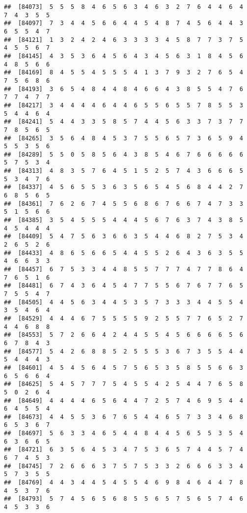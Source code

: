 \documentclass[
]{book}
\begin{document}
\begin{verbatim}
##  [84073]  5  5  5  8  4  6  5  6  3  4  6  3  2  7  6  4  4  6  4  7  4  3  5  5
##  [84097]  7  3  4  4  5  6  6  4  4  5  4  8  7  4  5  6  4  4  3  6  5  5  4  7
##  [84121]  1  3  2  4  2  4  6  3  3  3  3  4  5  8  7  7  3  7  5  4  5  5  6  7
##  [84145]  4  3  5  3  6  4  5  6  4  3  4  5  6  3  1  8  4  5  6  4  8  5  6  6
##  [84169]  8  4  5  5  4  5  5  5  4  1  3  7  9  3  2  7  6  5  4  7  5  6  8  6
##  [84193]  3  6  5  4  8  4  4  8  4  6  6  4  3  8  5  5  4  7  6  7  7  4  7  7
##  [84217]  3  4  4  4  4  6  4  4  6  5  5  6  5  5  7  8  5  5  3  5  4  4  6  4
##  [84241]  5  4  4  3  3  5  8  5  7  4  4  5  6  3  3  7  3  7  7  7  8  5  6  5
##  [84265]  3  5  6  4  8  4  5  3  7  5  5  6  5  7  3  6  5  9  4  5  5  3  5  6
##  [84289]  5  5  0  5  8  5  6  4  3  8  5  4  6  7  6  6  6  6  6  5  7  5  3  4
##  [84313]  4  8  3  5  7  6  4  5  1  5  2  5  7  4  3  6  6  6  5  5  3  4  7  6
##  [84337]  4  5  6  5  5  3  6  3  5  6  5  4  5  6  8  4  4  2  7  6  8  5  6  5
##  [84361]  7  6  2  6  7  4  5  5  6  8  6  7  6  6  7  4  7  3  3  5  1  5  6  6
##  [84385]  3  5  4  5  5  5  4  4  4  5  6  7  6  3  7  4  3  8  5  4  5  4  4  4
##  [84409]  5  4  7  5  6  3  6  6  3  5  4  4  6  8  2  7  5  3  4  2  6  5  2  6
##  [84433]  4  8  6  5  6  6  5  4  4  5  5  2  6  4  3  6  3  5  5  4  6  6  3  3
##  [84457]  6  7  5  3  3  4  4  8  5  5  7  7  7  4  7  7  8  6  4  7  6  5  1  6
##  [84481]  6  7  4  3  6  4  5  4  7  7  5  5  6  7  6  7  7  6  5  7  5  5  4  7
##  [84505]  4  4  5  6  3  4  4  5  3  5  7  3  3  3  4  4  5  5  4  3  5  4  6  4
##  [84529]  4  4  4  6  7  5  5  5  5  9  2  5  5  7  7  6  5  2  7  4  4  6  8  8
##  [84553]  5  7  2  6  6  4  2  4  4  5  5  4  5  6  6  6  6  5  6  6  7  8  4  3
##  [84577]  5  4  2  6  8  8  5  2  5  5  5  3  6  7  3  5  5  4  4  5  4  4  4  3
##  [84601]  4  5  4  5  6  4  5  7  5  6  5  3  5  8  5  5  6  6  3  6  5  6  6  4
##  [84625]  5  4  5  7  7  7  5  4  5  5  4  2  5  4  4  7  6  5  8  5  0  2  6  4
##  [84649]  4  4  4  4  6  5  6  4  4  7  2  5  7  4  6  9  5  4  4  6  4  5  5  4
##  [84673]  4  4  5  5  3  6  7  6  5  4  4  6  5  7  3  3  4  6  8  6  5  3  6  7
##  [84697]  5  6  3  3  4  6  5  4  4  8  4  4  5  6  5  5  3  5  4  6  3  6  6  5
##  [84721]  6  3  5  6  4  5  3  4  7  5  3  6  5  7  4  4  5  7  4  6  7  4  5  3
##  [84745]  7  2  6  6  6  3  7  5  7  5  3  3  2  6  6  6  3  3  4  5  7  3  5  5
##  [84769]  4  4  3  4  4  5  4  5  5  4  6  9  8  4  6  4  4  7  8  4  5  3  7  6
##  [84793]  5  7  4  5  6  5  6  8  5  5  6  5  7  5  6  5  7  4  6  4  5  3  3  6

\end{verbatim}
\end{document}
